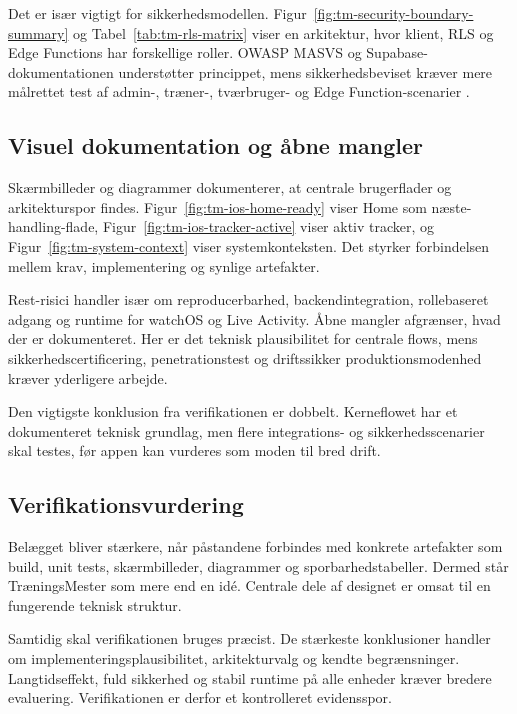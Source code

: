 Det er især vigtigt for sikkerhedsmodellen. Figur~\ref{fig:tm-security-boundary-summary} og Tabel~\ref{tab:tm-rls-matrix} viser en arkitektur, hvor klient, RLS og Edge Functions har forskellige roller. OWASP MASVS og Supabase-dokumentationen understøtter princippet, mens sikkerhedsbeviset kræver mere målrettet test af admin-, træner-, tværbruger- og Edge Function-scenarier \cite{owasp2024_masvs,supabase_rls_docs,supabase_securing_api_docs}.

\subsection{Visuel dokumentation og åbne mangler}

Skærmbilleder og diagrammer dokumenterer, at centrale brugerflader og arkitekturspor findes. Figur~\ref{fig:tm-ios-home-ready} viser Home som næste-handling-flade, Figur~\ref{fig:tm-ios-tracker-active} viser aktiv tracker, og Figur~\ref{fig:tm-system-context} viser systemkonteksten. Det styrker forbindelsen mellem krav, implementering og synlige artefakter.

Rest-risici handler især om reproducerbarhed, backendintegration, rollebaseret adgang og runtime for watchOS og Live Activity. Åbne mangler afgrænser, hvad der er dokumenteret. Her er det teknisk plausibilitet for centrale flows, mens sikkerhedscertificering, penetrationstest og driftssikker produktionsmodenhed kræver yderligere arbejde.

Den vigtigste konklusion fra verifikationen er dobbelt. Kerneflowet har et dokumenteret teknisk grundlag, men flere integrations- og sikkerhedsscenarier skal testes, før appen kan vurderes som moden til bred drift.

\subsection{Verifikationsvurdering}

Belægget bliver stærkere, når påstandene forbindes med konkrete artefakter som build, unit tests, skærmbilleder, diagrammer og sporbarhedstabeller. Dermed står TræningsMester som mere end en idé. Centrale dele af designet er omsat til en fungerende teknisk struktur.

Samtidig skal verifikationen bruges præcist. De stærkeste konklusioner handler om implementeringsplausibilitet, arkitekturvalg og kendte begrænsninger. Langtidseffekt, fuld sikkerhed og stabil runtime på alle enheder kræver bredere evaluering. Verifikationen er derfor et kontrolleret evidensspor.

